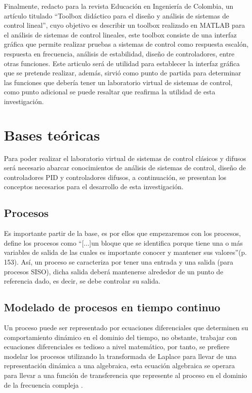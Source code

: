 	Finalmente, \textcite{cadavid2009toolbox} redacto para la revista Educación en Ingeniería de Colombia, un artículo titulado \enquote{Toolbox didáctico para el diseño y análisis de sistemas de control lineal}, cuyo objetivo es describir un toolbox realizado en MATLAB para el análisis de sistemas de control lineales, este toolbox consiste de una interfaz gráfica que permite realizar pruebas a sistemas de control como respuesta escalón, respuesta en frecuencia, análisis de estabilidad, diseño de controladores, entre otras funciones. Este articulo será de utilidad para establecer la interfaz gráfica que se pretende realizar, además, sirvió como punto de partida para determinar las funciones que debería tener un laboratorio virtual de sistemas de control, como punto adicional se puede resaltar que reafirma la utilidad de esta investigación. 
	
\section{Bases teóricas}
	
	Para poder realizar el laboratorio virtual de sistemas de control clásicos y difusos será necesario abarcar conocimientos de análisis de sistemas de control, diseño de controladores PID y controladores difusos, a continuación, se presentan los conceptos necesarios para el desarrollo de esta investigación.
	
	\subsection{Procesos}
		
		Es importante partir de la base, es por ellos que empezaremos con los procesos, \textcite{sanchez2003control} define los procesos como \enquote{[...]un bloque que se identifica porque tiene una o más variables de salida de las cuales es importante conocer y mantener sus valores}(p.$\,$153). Así, un proceso se caracteriza por tener una entrada y una salida (para procesos SISO), dicha salida deberá mantenerse alrededor de un punto de referencia dado, es decir, se debe controlar su salida.
	
	\subsection{Modelado de procesos en tiempo continuo}
	
		Un proceso puede ser representado por ecuaciones diferenciales que determinen su comportamiento dinámico en el dominio del tiempo, no obstante, trabajar con ecuaciones diferenciales es tedioso a nivel matemático, por tanto, se prefiere modelar los procesos utilizando la transformada de Laplace para llevar de una representación dinámica a una algebraica, esta ecuación algebraica se operara para llevar a una función de transferencia que represente al proceso en el dominio de la frecuencia compleja \Parencite{smith1985principles}.
	
